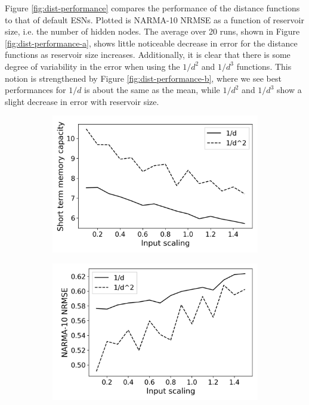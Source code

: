 Figure \ref{fig:dist-performance} compares the performance of the distance
functions to that of default ESNs. Plotted is NARMA-10 NRMSE as a function of
reservoir size, i.e. the number of hidden nodes. The average over 20 runs, shown
in Figure \ref{fig:dist-performance-a}, shows little noticeable decrease in
error for the distance functions as reservoir size increases. Additionally, it
is clear that there is some degree of variability in the error when using the
$1/d^2$ and $1/d^3$ functions. This notion is strengthened by Figure
\ref{fig:dist-performance-b}, where we see best performances for $1/d$ is about
the same as the mean, while $1/d^2$ and $1/d^3$ show a slight decrease in error
with reservoir size.

\begin{figure}[htb]
  \centering
  \begin{subfigure}{.49\textwidth}
    \centering
    \includegraphics[width=1.0\linewidth]{figures/RGG-dist-mc.png}
    \caption{}
    \label{fig:dist-performance-is-a}
  \end{subfigure}
  \begin{subfigure}{.49\textwidth}
    \centering
    \includegraphics[width=1.0\linewidth]{figures/RGG-dist-performance-is.png}

\end{subfigure}
\end{figure}
